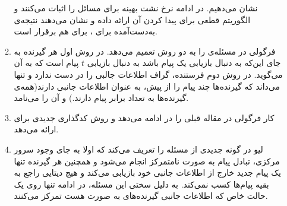 \begin{enumerate}
\begin{enumerate}
 		نشان می‌دهیم. در ادامه نرخ نشت بهینه برای مسائل
 		\icod
 	را اثبات می‌کنند و الگوریتم قطعی برای پیدا کردن آن ارائه داده و نشان می‌دهند نتیجه‌ی به‌دست‌آمده برای
 		\icod،
 		برای
 		\picod
 		هم برقرار است.
 		\item 
 		فرگولی در
 		\cite{6620405}
 		مسئله‌ی
 		\picod
 		را به دو روش تعمیم می‌دهد. در روش اول هر گیرنده به جای این‌که به دنبال بازیابی یک پیام باشد به دنبال بازیابی
 		$t$
 		پیام است که به آن
 		می‌گوید.
 		در روش دوم فرستنده، گراف اطلاعات جالبی را در دست ندارد و تنها می‌داند که گیرنده‌ها چند پیام را از پیش، به عنوان اطلاعات جانبی دارند(همه‌ی گیرنده‌ها به تعداد برابر پیام دارند.) و آن را
 		می‌نامد.
 		\item 
 		 کار فرگولی در مقاله قبلی را در
 		\cite{8625330}
 		ادامه می‌دهد و روش کدگذاری جدیدی برای 
 		ارائه می‌دهد.
 		\item 
 		لیو در
 		\cite{9173957}
 		گونه جدیدی از مسئله را تعریف می‌کند که اولا به جای وجود سرور مرکزی، تبادل پیام به صورت نامتمرکز انجام می‌شود و همچنین هر گیرنده تنها یک پیام جدید خارج از اطلاعات جانبی خود بازیابی می‌کند و هیچ دیتایی راجع به بقیه پیام‌ها کسب نمی‌کند. به دلیل سختی این مسئله، در ادامه تنها روی یک حالت خاص که اطلاعات جانبی گیرنده‌های به صورت
 		هست تمرکز می‌کنند.	
 		

\end{enumerate}
\end{enumerate}
